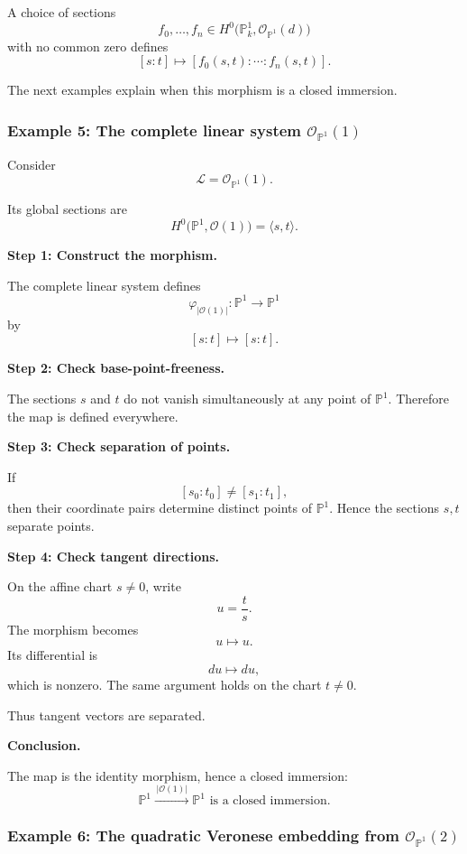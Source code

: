 \documentclass[12pt,a4paper]{article}
\theoremstyle{notespace}
\begin{document}
A choice of sections
\[
f_{0},\ldots,f_{n}
\in
H^{0}\bigl(\mathbb{P}^{1}_{k},\mathcal{O}_{\mathbb{P}^{1}}(d)\bigr)
\]
with no common zero defines
\[
[s:t]
\longmapsto
[f_{0}(s,t):\cdots:f_{n}(s,t)].
\]

The next examples explain when this morphism is a closed immersion.

\subsubsection{Example 5: The complete linear system \(\mathcal{O}_{\mathbb{P}^{1}}(1)\)}

Consider
\[
\mathcal{L}=\mathcal{O}_{\mathbb{P}^{1}}(1).
\]

Its global sections are
\[
H^{0}\bigl(\mathbb{P}^{1},\mathcal{O}(1)\bigr)
=
\langle s,t\rangle.
\]

\textbf{Step 1: Construct the morphism.}

The complete linear system defines
\[
\varphi_{|\mathcal{O}(1)|}:
\mathbb{P}^{1}
\longrightarrow
\mathbb{P}^{1}
\]
by
\[
[s:t]\longmapsto [s:t].
\]

\textbf{Step 2: Check base-point-freeness.}

The sections \(s\) and \(t\) do not vanish simultaneously at any point of \(\mathbb{P}^{1}\). Therefore the map is defined everywhere.

\textbf{Step 3: Check separation of points.}

If
\[
[s_{0}:t_{0}]\neq [s_{1}:t_{1}],
\]
then their coordinate pairs determine distinct points of \(\mathbb{P}^{1}\). Hence the sections \(s,t\) separate points.

\textbf{Step 4: Check tangent directions.}

On the affine chart \(s\neq 0\), write
\[
u=\frac{t}{s}.
\]
The morphism becomes
\[
u\longmapsto u.
\]
Its differential is
\[
du\longmapsto du,
\]
which is nonzero. The same argument holds on the chart \(t\neq 0\).

Thus tangent vectors are separated.

\textbf{Conclusion.}

The map is the identity morphism, hence a closed immersion:
\[
\boxed{
	\mathbb{P}^{1}
	\xrightarrow{\,|\mathcal{O}(1)|\,}
	\mathbb{P}^{1}
	\text{ is a closed immersion.}
}
\]

\subsubsection{Example 6: The quadratic Veronese embedding from \(\mathcal{O}_{\mathbb{P}^{1}}(2)\)}
\end{document}
